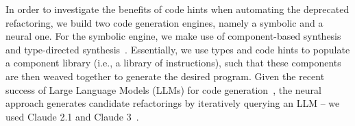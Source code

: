 \documentclass[conference]{IEEEtran}
\begin{document}

In order to investigate the benefits of code hints when automating the deprecated refactoring,
we build two code generation engines, namely a symbolic and a neural one.
%
For the symbolic engine, we make use of component-based synthesis~\cite{DBLP:conf/icse/JhaGST10,DBLP:conf/pldi/GulwaniJTV11,DBLP:conf/popl/FengM0DR17}
and type-directed synthesis~\cite{DBLP:conf/sfp/Katayama05,DBLP:conf/pldi/OseraZ15,DBLP:journals/pacmpl/YamaguchiMDW21}. Essentially, we use types and code hints to populate
a component library (i.e., a library of instructions), such that these components are then weaved together to generate the desired program.
Given the recent success of Large Language Models (LLMs) for code generation~\cite{chen2022codet,DBLP:journals/corr/abs-2108-07732,DBLP:journals/corr/abs-2302-05527,DBLP:journals/corr/abs-2202-13169,llmsforcodecompletion,codegenclasslevel,ni2023lever,zhang2023repocoder,lostintranslation,Ding2024cocomic,yang2024sweagent}, the neural approach 
generates candidate refactorings by iteratively querying an LLM -- we used Claude 2.1 and Claude 3~\cite{claude}.

\end{document}
